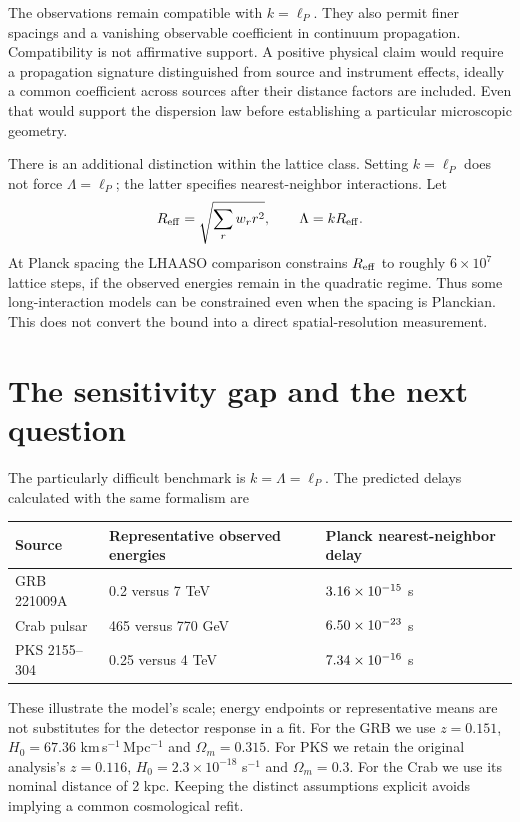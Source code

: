 \documentclass[11pt]{article}
\begin{document}
The observations remain compatible with $k=\ell_P$. They also permit finer spacings and a vanishing observable coefficient in continuum propagation. Compatibility is not affirmative support. A positive physical claim would require a propagation signature distinguished from source and instrument effects, ideally a common coefficient across sources after their distance factors are included. Even that would support the dispersion law before establishing a particular microscopic geometry.

There is an additional distinction within the lattice class. Setting $k=\ell_P$ does not force $\Lambda=\ell_P$; the latter specifies nearest-neighbor interactions. Let
\begin{equation}
 R_{\rm eff}=\sqrt{\sum_r w_r r^2},\qquad \Lambda=kR_{\rm eff}.
\end{equation}
At Planck spacing the LHAASO comparison constrains $R_{\rm eff}$ to roughly $6\times10^7$ lattice steps, if the observed energies remain in the quadratic regime. Thus some long-interaction models can be constrained even when the spacing is Planckian. This does not convert the bound into a direct spatial-resolution measurement.

\newpage
\section{The sensitivity gap and the next question}
The particularly difficult benchmark is $k=\Lambda=\ell_P$. The predicted delays calculated with the same formalism are
\begin{center}
\begin{tabular}{lll}
\hline
Source & Representative observed energies & Planck nearest-neighbor delay\\ \hline
GRB 221009A & 0.2 versus 7 TeV & $3.16\times10^{-15}$ s\\
Crab pulsar & 465 versus 770 GeV & $6.50\times10^{-23}$ s\\
PKS 2155--304 & 0.25 versus 4 TeV & $7.34\times10^{-16}$ s\\ \hline
\end{tabular}
\end{center}
These illustrate the model's scale; energy endpoints or representative means are not substitutes for the detector response in a fit. For the GRB we use $z=0.151$, $H_0=67.36$ km\,s$^{-1}$\,Mpc$^{-1}$ and $\Omega_m=0.315$. For PKS we retain the original analysis's $z=0.116$, $H_0=2.3\times10^{-18}$ s$^{-1}$ and $\Omega_m=0.3$. For the Crab we use its nominal distance of 2 kpc. Keeping the distinct assumptions explicit avoids implying a common cosmological refit.
\end{document}

